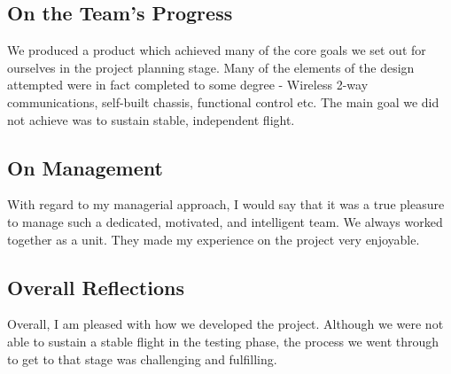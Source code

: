 \documentclass[a4paper,11pt]{article}
\begin{document}
\subsection{On the Team's Progress}
We produced a product which achieved many of the core goals we set out for ourselves in the project planning stage. Many of the elements of the design attempted were in fact completed to some degree - Wireless 2-way communications, self-built chassis, functional control etc. The main goal we did not achieve was to sustain stable, independent flight. 
\subsection{On Management}
With regard to my managerial approach, I would say that it was a true pleasure to manage such a dedicated, motivated, and intelligent team. We always worked together as a unit. They made my experience on the project very enjoyable.
\subsection{Overall Reflections}
Overall, I am pleased with how we developed the project. Although we were not able to sustain a stable flight in the testing phase, the process we went through to get to that stage was challenging and fulfilling. 





\appendix
\newpage
\end{document}
